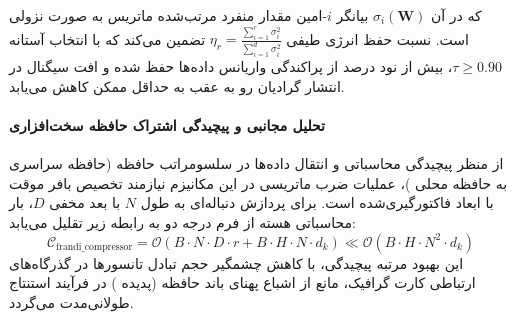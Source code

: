 که در آن $\sigma_i(\mathbf{W})$ بیانگر $i$-امین مقدار منفرد مرتب‌شده ماتریس به صورت نزولی است. نسبت حفظ انرژی طیفی $\eta_r = \frac{\sum_{i=1}^r \sigma_i^2}{\sum_{i=1}^{d} \sigma_i^2}$ تضمین می‌کند که با انتخاب آستانه $\tau \ge 0.90$، بیش از نود درصد از پراکندگی واریانس داده‌ها حفظ شده و افت سیگنال در انتشار گرادیان رو به عقب به حداقل ممکن کاهش می‌یابد.

\paragraph{تحلیل مجانبی و پیچیدگی اشتراک حافظه سخت‌افزاری}
از منظر پیچیدگی محاسباتی و انتقال داده‌ها در سلسومراتب حافظه (حافظه سراسری  به حافظه محلی )، عملیات ضرب ماتریسی در این مکانیزم نیازمند تخصیص بافر موقت با ابعاد فاکتورگیری‌شده است. برای پردازش دنباله‌ای به طول $N$ با بعد مخفی $D$، بار محاسباتی هسته از فرم درجه دو به رابطه زیر تقلیل می‌یابد:
\begin{equation}
\label{eq:complexity_frandi_compressor}
\mathcal{C}_{\text{frandi\_compressor}} = \mathcal{O}\left( B \cdot N \cdot D \cdot r + B \cdot H \cdot N \cdot d_k \right) \ll \mathcal{O}\left( B \cdot H \cdot N^2 \cdot d_k \right)
\end{equation}
این بهبود مرتبه پیچیدگی، با کاهش چشمگیر حجم تبادل تانسورها در گذرگاه‌های ارتباطی کارت گرافیک، مانع از اشباع پهنای باند حافظه (پدیده ) در فرآیند استنتاج طولانی‌مدت می‌گردد.
